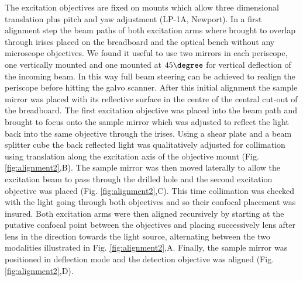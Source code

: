 \documentclass[12pt]{spieman}  %
\begin{document}
The excitation objectives are fixed on mounts which allow three dimensional translation plus pitch and yaw adjustment (LP-1A, Newport). In a first alignment step the beam paths of both excitation arms where brought to overlap through irises placed on the breadboard and the optical bench without any microscope objectives. We found it useful to use two mirrors in each periscope, one vertically mounted and one mounted at $45\degree$ for vertical deflection of the incoming beam. In this way full beam steering can be achieved to realign the periscope before hitting the galvo scanner. After this initial alignment the sample mirror was placed with its reflective surface in the centre of the central cut-out of the breadboard. The first excitation objective was placed into the beam path and brought to focus onto the sample mirror which was adjusted to reflect the light back into the same objective through the irises. Using a shear plate and a beam splitter cube the back reflected light was qualitatively adjusted for collimation using translation along the excitation axis of the objective mount (Fig. \ref{fig:alignment2},B). The sample mirror was then moved laterally to allow the excitation beam to pass through the drilled hole and the second excitation objective was placed (Fig. \ref{fig:alignment2},C). This time collimation was checked with the light going through both objectives and so their confocal placement was insured. Both excitation arms were then aligned recursively by starting at the putative confocal point between the objectives and placing successively lens after lens in the direction towards the light source, alternating between the two modalities illustrated in Fig. \ref{fig:alignment2},A. Finally, the sample mirror was positioned in deflection mode and the detection objective was aligned (Fig. \ref{fig:alignment2},D). 
\end{document}
